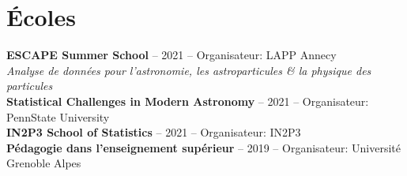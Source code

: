 \section{Écoles}\label{schools}

\textbf{ESCAPE Summer School} -- 2021 --
    Organisateur: LAPP Annecy \\
    \textit{Analyse de données pour l'astronomie, les astroparticules \& la physique des particules} \\[5pt]
\textbf{Statistical Challenges in Modern Astronomy} -- 2021 --
    Organisateur: PennState University \\[5pt]
\textbf{IN2P3 School of Statistics} -- 2021 --
    Organisateur: IN2P3 \\[5pt]
\textbf{Pédagogie dans l'enseignement supérieur} -- 2019 --
    Organisateur: Universit\'e Grenoble Alpes
